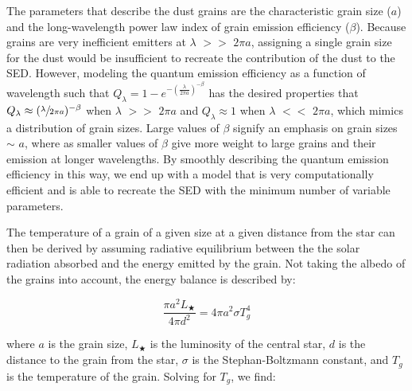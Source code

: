 The parameters that describe the dust grains are the characteristic grain size ($a$) and the long-wavelength power law index of grain emission efficiency ($\beta$). Because grains are very inefficient emitters at $\lambda$ $>>$ $2\pi a$, assigning a single grain size for the dust would be insufficient to recreate the contribution of the dust to the SED. However, modeling the quantum emission efficiency as a function of wavelength such that $Q_{\lambda} = 1 - e^{-(\frac{\lambda}{2\pi a})^{-\beta}}$ has the desired properties that $Q_{\lambda} \approx (\sfrac{\lambda}{2\pi a})^{-\beta}$ when $\lambda$ $>>$ $2\pi a$ and $Q_{\lambda} \approx 1$ when $\lambda$ $<<$ $2\pi a$, which mimics a distribution of grain sizes. Large values of $\beta$ signify an emphasis on grain sizes $\sim$ $a$, where as smaller values of $\beta$ give more weight to large grains and their emission at longer wavelengths. By smoothly describing the quantum emission efficiency in this way, we end up with a model that is very computationally efficient and is able to recreate the SED with the minimum number of variable parameters. 



The temperature of a grain of a given size at a given distance from the star can then be derived by assuming radiative equilibrium between the the solar radiation absorbed and the energy emitted by the grain. Not taking the albedo of the grains into account, the energy balance is described by:

\begin{equation}\label{EBalance}
\frac{\pi a^{2} L_{\bigstar}}{4 \pi d^{2}} = 4 \pi a^{2} \sigma T_{g}^{4}
\end{equation}

where $a$ is the grain size, $L_{\bigstar}$ is the luminosity of the central star, $d$ is the distance to the grain from the star, $\sigma$ is the Stephan-Boltzmann constant, and $T_{g}$ is the temperature of the grain. Solving for $T_{g}$, we find:

